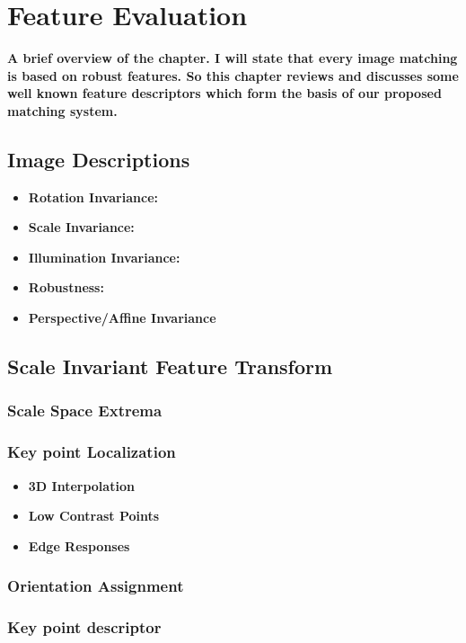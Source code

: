 \chapter{Feature Evaluation}
\label{chap:new}

\textbf{A brief overview of the chapter.
I will state that every image matching is based on 
robust features. So this chapter reviews and 
discusses some well known feature descriptors 
which form the basis of our proposed matching system.}


\section{Image Descriptions}
\begin{itemize}
\item \textbf{Rotation Invariance:}
\item \textbf{Scale Invariance:}
\item \textbf{Illumination Invariance:}
\item \textbf{Robustness:}
\item \textbf{Perspective/Affine Invariance}
\end{itemize}

\section{Scale Invariant Feature Transform}
\subsection{Scale Space Extrema}
\subsection {Key point Localization}
\begin{itemize}
\item \textbf{3D Interpolation} 
\item \textbf{Low Contrast Points} 
\item \textbf{Edge Responses}
 \end{itemize}
\subsection{Orientation Assignment}
\subsection{Key point descriptor}
